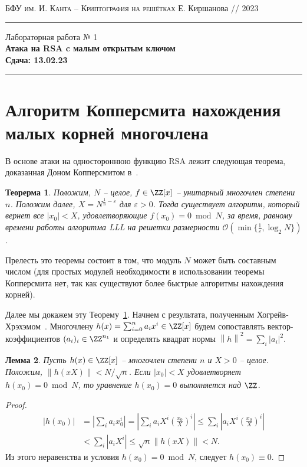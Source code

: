 \documentclass[11pt]{exam}
\newtheorem{theorem}{Теорерма}
\newtheorem{lemma}[theorem]{Лемма}
\theoremstyle{definition}
\newcommand{\bigO}{\mathcal{O}}
\newcommand*\abs[1]{\left\lvert#1\right\rvert}
\newcommand*\norm[1]{\left\lVert#1\right\rVert}
\begin{document}
	{\noindent
		\textsc{БФУ им. И. Канта -- Криптография на решётках}
		\hfill {Е. Киршанова // 2023\\}
\hrule
\begin{center}
	{\LARGE
			Лабораторная работа № 1 \\[5pt]
			\textbf{Атака на RSA c малым открытым ключом } \\[10pt]
	 	 \textbf{Сдача: 13.02.23}  \\
	}
\end{center}
\hrule \vspace{5mm}
	
	\thispagestyle{empty}
	
	\vspace{0.2cm}
	\section{Алгоритм Копперсмита нахождения малых корней многочлена}
	
	В основе атаки на одностороннюю функцию RSA лежит следующая теорема, доказанная Доном Копперсмитом в~\cite{Coppersmith}.
	
	\begin{theorem}\label{thm:Coppersmith}
		Положим, $N$ -- целое, $f\in \ZZ[x]$ -- унитарный многочлен степени $n$. Положим далее, $X = N^{\frac{1}{n}-\varepsilon}$ для $\varepsilon>0$. Тогда существует алгоритм, который вернет все $|x_0| < X$, удовлетворяющие $f(x_0) =0 \bmod N$, за время, равному времени работы алгоритма LLL на решетки размерности $\bigO(\min\{ \frac{1}{\varepsilon}, \log_2 N \})$.
	\end{theorem}

	Прелесть это теоремы состоит в том, что модуль $N$ может быть составным числом (для простых модулей необходимости в использовании теоремы Копперсмита нет, так как существуют более быстрые алгоритмы нахождения корней).
	
	Далее мы докажем эту Теорему~\ref{thm:Coppersmith}. Начнем с результата, полученным Хогрейв-Хрэхэмом~\cite{HG}. Многочлену $h(x) = \sum_{i=0}^{n} a_i x^i \in \ZZ[x]$ будем сопоставлять вектор-коэффициентов $(a_i)_i\in \ZZ^{n_1}$ и определять квадрат нормы $\norm{h}^2 = \sum_i \abs{a_i}^2$. 
	\begin{lemma}\label{lem:HG}
		Пусть $h(x) \in \ZZ[x]$ -- многочлен степени $n$ и $X>0$ -- целое. Положим, $\norm{h(xX)} < N / \sqrt{n}$. Если $\abs{x_0} < X$ удовлетворяет $h(x_0) = 0 \bmod N$, то уравнение $h(x_0) = 0$ выполняется над $\ZZ$.
	\end{lemma}
	\begin{proof}
	\begin{align*}
		\abs{h(x_0)} &=\abs{\sum_i a_i x^i_0} = \abs{ \sum_i a_i X^i \left( \frac{x_0}{X} \right)^i} \leq \sum_i \abs{a_i X^i \left( \frac{x_0}{X} \right)^i} \\
		& < \sum_i \abs{a_i X^i} \leq \sqrt{n} \norm{h(xX)} < N. 
	\end{align*}
	Из этого неравенства и условия $h(x_0) = 0 \bmod N$, следует $h(x_0) \equiv 0$. 
	\end{proof}

}
\end{document}
